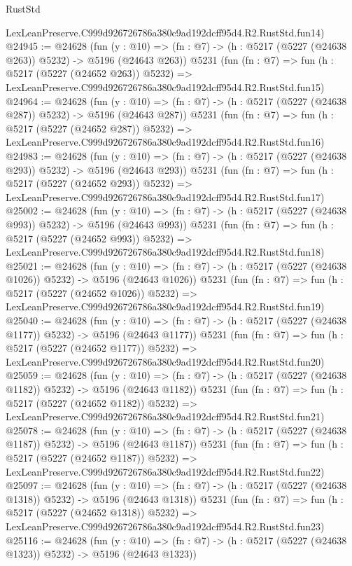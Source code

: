 \begin{lexlean}{RustStd}
\begin{coremodule}
    LexLeanPreserve.C999d926726786a380c9ad192dcff95d4.R2.RustStd.fun14)
@24945 := @24628
    (fun (y : @10) => (fn : @7) -> (h : @5217 (@5227 (@24638 @263)) @5232) -> @5196 (@24643 @263))
    @5231
    (fun (fn : @7) =>
    fun (h : @5217 (@5227 (@24652 @263)) @5232) =>
    LexLeanPreserve.C999d926726786a380c9ad192dcff95d4.R2.RustStd.fun15)
@24964 := @24628
    (fun (y : @10) => (fn : @7) -> (h : @5217 (@5227 (@24638 @287)) @5232) -> @5196 (@24643 @287))
    @5231
    (fun (fn : @7) =>
    fun (h : @5217 (@5227 (@24652 @287)) @5232) =>
    LexLeanPreserve.C999d926726786a380c9ad192dcff95d4.R2.RustStd.fun16)
@24983 := @24628
    (fun (y : @10) => (fn : @7) -> (h : @5217 (@5227 (@24638 @293)) @5232) -> @5196 (@24643 @293))
    @5231
    (fun (fn : @7) =>
    fun (h : @5217 (@5227 (@24652 @293)) @5232) =>
    LexLeanPreserve.C999d926726786a380c9ad192dcff95d4.R2.RustStd.fun17)
@25002 := @24628
    (fun (y : @10) => (fn : @7) -> (h : @5217 (@5227 (@24638 @993)) @5232) -> @5196 (@24643 @993))
    @5231
    (fun (fn : @7) =>
    fun (h : @5217 (@5227 (@24652 @993)) @5232) =>
    LexLeanPreserve.C999d926726786a380c9ad192dcff95d4.R2.RustStd.fun18)
@25021 := @24628
    (fun (y : @10) => (fn : @7) -> (h : @5217 (@5227 (@24638 @1026)) @5232) -> @5196 (@24643 @1026))
    @5231
    (fun (fn : @7) =>
    fun (h : @5217 (@5227 (@24652 @1026)) @5232) =>
    LexLeanPreserve.C999d926726786a380c9ad192dcff95d4.R2.RustStd.fun19)
@25040 := @24628
    (fun (y : @10) => (fn : @7) -> (h : @5217 (@5227 (@24638 @1177)) @5232) -> @5196 (@24643 @1177))
    @5231
    (fun (fn : @7) =>
    fun (h : @5217 (@5227 (@24652 @1177)) @5232) =>
    LexLeanPreserve.C999d926726786a380c9ad192dcff95d4.R2.RustStd.fun20)
@25059 := @24628
    (fun (y : @10) => (fn : @7) -> (h : @5217 (@5227 (@24638 @1182)) @5232) -> @5196 (@24643 @1182))
    @5231
    (fun (fn : @7) =>
    fun (h : @5217 (@5227 (@24652 @1182)) @5232) =>
    LexLeanPreserve.C999d926726786a380c9ad192dcff95d4.R2.RustStd.fun21)
@25078 := @24628
    (fun (y : @10) => (fn : @7) -> (h : @5217 (@5227 (@24638 @1187)) @5232) -> @5196 (@24643 @1187))
    @5231
    (fun (fn : @7) =>
    fun (h : @5217 (@5227 (@24652 @1187)) @5232) =>
    LexLeanPreserve.C999d926726786a380c9ad192dcff95d4.R2.RustStd.fun22)
@25097 := @24628
    (fun (y : @10) => (fn : @7) -> (h : @5217 (@5227 (@24638 @1318)) @5232) -> @5196 (@24643 @1318))
    @5231
    (fun (fn : @7) =>
    fun (h : @5217 (@5227 (@24652 @1318)) @5232) =>
    LexLeanPreserve.C999d926726786a380c9ad192dcff95d4.R2.RustStd.fun23)
@25116 := @24628
    (fun (y : @10) => (fn : @7) -> (h : @5217 (@5227 (@24638 @1323)) @5232) -> @5196 (@24643 @1323))

\end{coremodule}
\end{lexlean}
